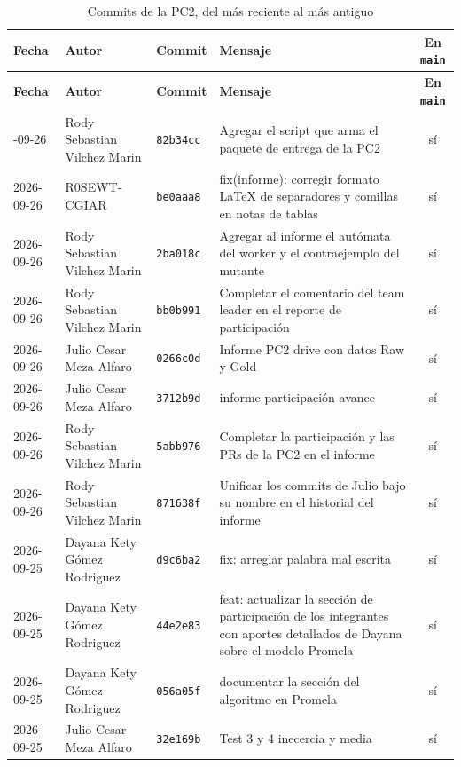 {\small
\begin{xltabular}{\textwidth}{@{}L{1.9cm}L{2.7cm}L{1.4cm}Yc@{}}
\caption{Commits de la PC2, del más reciente al más antiguo}\label{tab:commits}\\
\toprule
\textbf{Fecha} & \textbf{Autor} & \textbf{Commit} & \textbf{Mensaje} & \textbf{En \texttt{main}} \\
\midrule
\endfirsthead
\toprule
\textbf{Fecha} & \textbf{Autor} & \textbf{Commit} & \textbf{Mensaje} & \textbf{En \texttt{main}} \\
\midrule
\endhead
\bottomrule
{}-09-26 & Rody Sebastian Vilchez Marin & \texttt{82b34cc} & Agregar el script que arma el paquete de entrega de la PC2 & sí \\
2026-09-26 & R0SEWT-CGIAR & \texttt{be0aaa8} & fix(informe): corregir formato LaTeX de separadores y comillas en notas de tablas & sí \\
2026-09-26 & Rody Sebastian Vilchez Marin & \texttt{2ba018c} & Agregar al informe el autómata del worker y el contraejemplo del mutante & sí \\
2026-09-26 & Rody Sebastian Vilchez Marin & \texttt{bb0b991} & Completar el comentario del team leader en el reporte de participación & sí \\
2026-09-26 & Julio Cesar Meza Alfaro & \texttt{0266c0d} & Informe PC2 drive con datos Raw y Gold & sí \\
2026-09-26 & Julio Cesar Meza Alfaro & \texttt{3712b9d} & informe participación avance & sí \\
2026-09-26 & Rody Sebastian Vilchez Marin & \texttt{5abb976} & Completar la participación y las PRs de la PC2 en el informe & sí \\
2026-09-26 & Rody Sebastian Vilchez Marin & \texttt{871638f} & Unificar los commits de Julio bajo su nombre en el historial del informe & sí \\
2026-09-25 & Dayana Kety Gómez Rodriguez & \texttt{d9c6ba2} & fix: arreglar palabra mal escrita & sí \\
2026-09-25 & Dayana Kety Gómez Rodriguez & \texttt{44e2e83} & feat: actualizar la sección de participación de los integrantes con aportes detallados de Dayana sobre el modelo Promela & sí \\
2026-09-25 & Dayana Kety Gómez Rodriguez & \texttt{056a05f} & documentar la sección del algoritmo en Promela & sí \\
2026-09-25 & Julio Cesar Meza Alfaro & \texttt{32e169b} & Test 3 y 4 inecercia y media & sí \\

\end{xltabular}}
